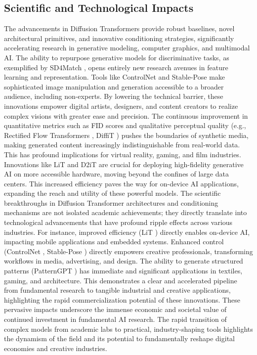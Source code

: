 \documentclass[a4paper]{article}
\begin{document}
\subsection{Scientific and Technological Impacts}
The advancements in Diffusion Transformers provide robust baselines, novel architectural primitives, and innovative conditioning strategies, significantly accelerating research in generative modeling, computer graphics, and multimodal AI. The ability to repurpose generative models for discriminative tasks, as exemplified by SD4Match \cite{Li2023SD4Match}, opens entirely new research avenues in feature learning and representation. Tools like ControlNet \cite{Zhang2023ControlNet} and Stable-Pose \cite{Wang2024StablePose} make sophisticated image manipulation and generation accessible to a broader audience, including non-experts. By lowering the technical barrier, these innovations empower digital artists, designers, and content creators to realize complex visions with greater ease and precision. The continuous improvement in quantitative metrics such as FID scores and qualitative perceptual quality (e.g., Rectified Flow Transformers \cite{Esser2024ScalingRectifiedFlow}, DiffiT \cite{Hatamizadeh2023DiffiT}) pushes the boundaries of synthetic media, making generated content increasingly indistinguishable from real-world data. This has profound implications for virtual reality, gaming, and film industries. Innovations like LiT \cite{Jiang2025LiT} and D2iT \cite{Jia2025D2iT} are crucial for deploying high-fidelity generative AI on more accessible hardware, moving beyond the confines of large data centers. This increased efficiency paves the way for on-device AI applications, expanding the reach and utility of these powerful models. The scientific breakthroughs in Diffusion Transformer architectures and conditioning mechanisms are not isolated academic achievements; they directly translate into technological advancements that have profound ripple effects across various industries. For instance, improved efficiency (LiT \cite{Jiang2025LiT}) directly enables on-device AI, impacting mobile applications and embedded systems. Enhanced control (ControlNet \cite{Zhang2023ControlNet}, Stable-Pose \cite{Wang2024StablePose}) directly empowers creative professionals, transforming workflows in media, advertising, and design. The ability to generate structured patterns (PatternGPT \cite{Riso2024StructuredPattern}) has immediate and significant applications in textiles, gaming, and architecture. This demonstrates a clear and accelerated pipeline from fundamental research to tangible industrial and creative applications, highlighting the rapid commercialization potential of these innovations. These pervasive impacts underscore the immense economic and societal value of continued investment in fundamental AI research. The rapid transition of complex models from academic labs to practical, industry-shaping tools highlights the dynamism of the field and its potential to fundamentally reshape digital economies and creative industries.
\end{document}
